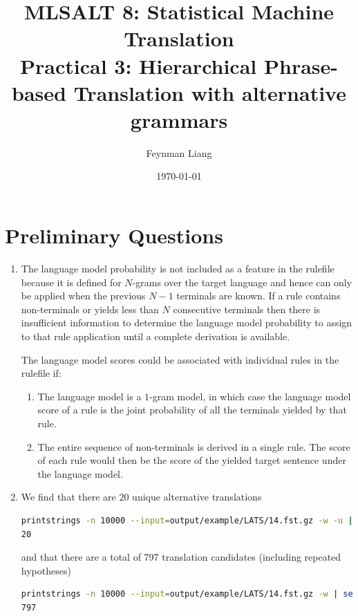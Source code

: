 \documentclass[a4paper,oneside,reqno]{amsart}
\newcommand{\authorname}{Feynman Liang}
\newcommand{\coursename}{MLSALT 8: Statistical Machine Translation}
\newcommand{\assignmentname}{Practical 3: Hierarchical Phrase-based Translation
with alternative grammars}
\begin{document}
\title{\coursename\\\assignmentname}

\author{\authorname}
\date{\today}

\maketitle

\section{Preliminary Questions}
\begin{enumerate}[label=\arabic*.]
  \item The language model probability is not included as a feature in the
    rulefile because it is defined for $N$-grams over the target language and
    hence can only be applied when the previous $N-1$ terminals are known.
    If a rule contains non-terminals or yields less than $N$ consecutive terminals
    then there is insufficient information to determine the language model probability
    to assign to that rule application until a complete derivation is available.

    The language model scores could be associated with individual rules in the rulefile if:
    \begin{enumerate}
      \item The language model is a $1$-gram model, in which case the language
        model score of a rule is the joint probability of all the terminals
        yielded by that rule.
      \item The entire sequence of non-terminals is derived in a single rule.
        The score of each rule would then be the score of the yielded target
        sentence under the language model.
    \end{enumerate}

  \item We find that there are $20$ unique alternative translations
    \begin{lstlisting}[language=bash]
printstrings -n 10000 --input=output/example/LATS/14.fst.gz -w -u | sed '/[EMPTY]/d' | wc -l
20
    \end{lstlisting}
    and that there are a total of 797 translation candidates (including repeated hypotheses)
    \begin{lstlisting}[language=bash]
printstrings -n 10000 --input=output/example/LATS/14.fst.gz -w | sed '/[EMPTY]/d' | wc -l
797
    \end{lstlisting}


\end{enumerate}
\end{document}
